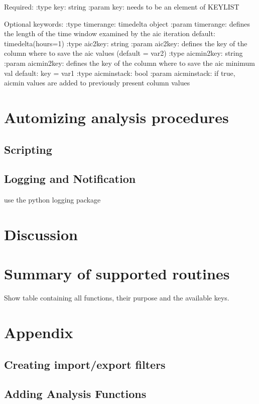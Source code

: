         Required:
        :type key: string
        :param key: needs to be an element of KEYLIST

        Optional keywords:
        :type timerange: timedelta object
        :param timerange: defines the length of the time window examined by the aic iteration
                        default: timedelta(hours=1)
        :type aic2key: string 
        :param aic2key: defines the key of the column where to save the aic values (default = var2)
        :type aicmin2key: string
        :param aicmin2key: defines the key of the column where to save the aic minimum val
                        default: key = var1
        :type aicminstack: bool
        :param aicminstack: if true, aicmin values are added to previously present column values

\section{Automizing analysis procedures}

\subsection{Scripting}

\subsection{Logging and Notification}\label{logging}

use the python logging package

\section{Discussion}


\section{Summary of supported routines}

Show table containing all functions, their purpose and the available keys.

\section{Appendix}

\subsection{Creating import/export filters}

\subsection{Adding Analysis Functions}


